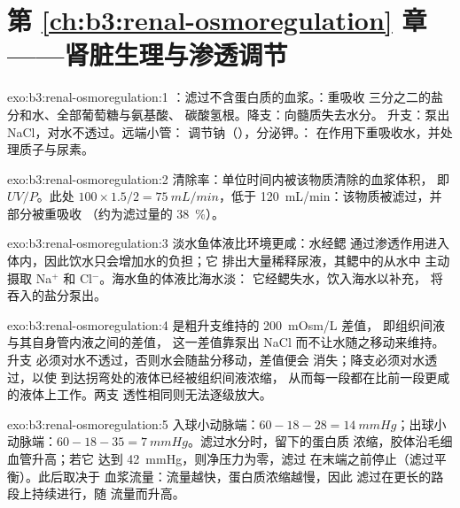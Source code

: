 \section*{第 \ref{ch:b3:renal-osmoregulation} 章——肾脏生理与渗透调节}

\begin{solution}{exo:b3:renal-osmoregulation:1}
：滤过不含蛋白质的血浆。：重吸收
三分之二的盐分和水、全部葡萄糖与氨基酸、
碳酸氢根。降支：向髓质失去水分。
升支：泵出 NaCl，对水不透过。远端小管：
调节钠（），分泌钾。：
在作用下重吸收水，并处理质子与尿素。
\end{solution}

\begin{solution}{exo:b3:renal-osmoregulation:2}
清除率：单位时间内被该物质清除的血浆体积，
即 $UV/P$。此处 $100\times 1.5/2 = \qty{75}{mL/min}$，低于
 \qty{120}{mL/min}：该物质被滤过，并部分被重吸收
（约为滤过量的 \qty{38}{\%}）。
\end{solution}

\begin{solution}{exo:b3:renal-osmoregulation:3}
淡水鱼体液比环境更咸：水经鳃
通过渗透作用进入体内，因此饮水只会增加水的负担；它
排出大量稀释尿液，其鳃中的从水中
主动摄取 Na$^{+}$ 和 Cl$^{-}$。海水鱼的体液比海水淡：
它经鳃失水，饮入海水以补充，
将吞入的盐分泵出。
\end{solution}

\begin{solution}{exo:b3:renal-osmoregulation:4}
是粗升支维持的 \qty{200}{mOsm/L} 差值，
即组织间液与其自身管内液之间的差值，
这一差值靠泵出 NaCl 而不让水随之移动来维持。升支
必须对水不透过，否则水会随盐分移动，差值便会
消失；降支必须对水透过，以使
到达拐弯处的液体已经被组织间液浓缩，
从而每一段都在比前一段更咸的液体上工作。两支
透性相同则无法逐级放大。
\end{solution}

\begin{solution}{exo:b3:renal-osmoregulation:5}
入球小动脉端：$60 - 18 - 28 = \qty{14}{mmHg}$；出球小动脉端：$60 - 18 -
35 = \qty{7}{mmHg}$。滤过水分时，留下的蛋白质
浓缩，胶体沿毛细血管升高；若它
达到 \qty{42}{mmHg}，则净压力为零，滤过
在末端之前停止（滤过平衡）。此后取决于
血浆流量：流量越快，蛋白质浓缩越慢，因此
滤过在更长的路段上持续进行，随
流量而升高。
\end{solution}

